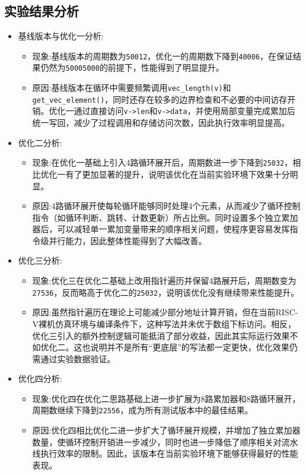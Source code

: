 \subsection{实验结果分析}
\begin{itemize}
    \item 基线版本与优化一分析:
    \begin{itemize}
        \item 现象:基线版本的周期数为\texttt{50012}，优化一的周期数下降到\texttt{40006}，在保证结果仍然为\texttt{50005000}的前提下，性能得到了明显提升。
        \item 原因:基线版本在循环中需要频繁调用\texttt{vec\_length(v)}和\texttt{get\_vec\_element()}，同时还存在较多的边界检查和不必要的中间访存开销。优化一通过直接访问\texttt{v->len}和\texttt{v->data}，并使用局部变量完成累加后统一写回，减少了过程调用和存储访问次数，因此执行效率明显提高。
    \end{itemize}

    \item 优化二分析:
    \begin{itemize}
        \item 现象:在优化一基础上引入4路循环展开后，周期数进一步下降到\texttt{25032}，相比优化一有了更加显著的提升，说明该优化在当前实验环境下效果十分明显。
        \item 原因:4路循环展开使每轮循环能够同时处理4个元素，从而减少了循环控制指令（如循环判断、跳转、计数更新）所占比例。同时设置多个独立累加器后，可以减轻单一累加变量带来的顺序相关问题，使程序更容易发挥指令级并行能力，因此整体性能得到了大幅改善。
    \end{itemize}

    \item 优化三分析:
    \begin{itemize}
        \item 现象:优化三在优化二基础上改用指针遍历并保留4路展开后，周期数变为\texttt{27536}，反而略高于优化二的\texttt{25032}，说明该优化没有继续带来性能提升。
        \item 原因:虽然指针遍历在理论上可能减少部分地址计算开销，但在当前RISC-V裸机仿真环境与编译条件下，这种写法并未优于数组下标访问。相反，优化三引入的额外控制逻辑可能抵消了部分收益，因此其实际运行效果不如优化二。这也说明并不是所有“更底层”的写法都一定更快，优化效果仍需通过实验数据验证。
    \end{itemize}

    \item 优化四分析:
    \begin{itemize}
        \item 现象:优化四在优化二思路基础上进一步扩展为8路累加器和8路循环展开，周期数继续下降到\texttt{22556}，成为所有测试版本中的最佳结果。
        \item 原因:优化四相比优化二进一步扩大了循环展开规模，并增加了独立累加器数量，使循环控制开销进一步减少，同时也进一步降低了顺序相关对流水线执行效率的限制。因此，该版本在当前实验环境下能够获得最好的性能表现。
    \end{itemize}


\end{itemize}

